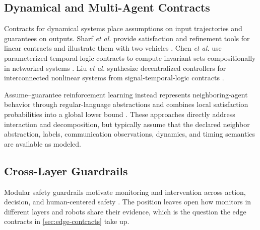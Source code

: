 \subsection{Dynamical and Multi-Agent Contracts}

Contracts for dynamical systems place assumptions on input trajectories and
guarantees on outputs.  Sharf \emph{et al.} provide satisfaction and refinement
tools for linear contracts and illustrate them with two vehicles
\cite{sharf2021dynamical}.  Chen \emph{et al.} use parameterized temporal-logic
contracts to compute invariant sets compositionally in networked systems
\cite{chen2019invariance}.  Liu \emph{et al.} synthesize decentralized
controllers for interconnected nonlinear systems from signal-temporal-logic
contracts \cite{liu2022stlcontracts}.

Assume--guarantee reinforcement learning instead represents neighboring-agent
behavior through regular-language abstractions and combines local satisfaction
probabilities into a global lower bound \cite{kazemi2024agrl}.  These approaches
directly address interaction and decomposition, but typically assume that the
declared neighbor abstraction, labels, communication observations, dynamics,
and timing semantics are available as modeled.

\subsection{Cross-Layer Guardrails}

Modular safety guardrails motivate monitoring and intervention across action,
decision, and human-centered safety \cite{kim2026guardrails}.  The position
leaves open how monitors in different layers and robots share their evidence,
which is the question the edge contracts in \cref{sec:edge-contracts} take up.
